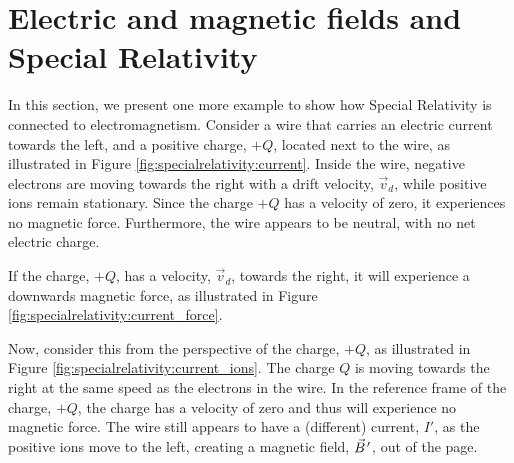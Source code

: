 \section{Electric and magnetic fields and Special Relativity}
In this section, we present one more example to show how Special Relativity is connected to electromagnetism. Consider a wire that carries an electric current towards the left, and a positive charge, $+Q$, located next to the wire, as illustrated in Figure \ref{fig:specialrelativity:current}.
Inside the wire, negative electrons are moving towards the right with a drift velocity, $\vec v_d$, while positive ions remain stationary. Since the charge $+Q$ has a velocity of zero, it experiences no magnetic force. Furthermore, the wire appears to be neutral, with no net electric charge.

If the charge, $+Q$, has a velocity, $\vec v_d$, towards the right, it will experience a downwards magnetic force, as illustrated in Figure \ref{fig:specialrelativity:current_force}.

Now, consider this from the perspective of the charge, $+Q$, as illustrated in Figure \ref{fig:specialrelativity:current_ions}. The charge $Q$ is moving towards the right at the same speed as the electrons in the wire. In the reference frame of the charge, $+Q$, the charge has a velocity of zero and thus will experience no magnetic force. The wire still appears to have a (different) current, $I'$, as the positive ions move to the left, creating a magnetic field, $\pvec B'$, out of the page.

